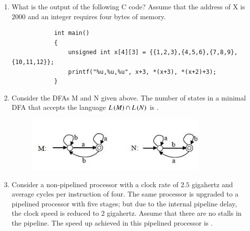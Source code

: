 \documentclass[journal,12pt,onecolumn]{IEEEtran}
\theoremstyle{remark}
\begin{document}
	
	\begin{enumerate}[resume]
		
		\item What is the output of the following C code?
		Assume that the address of X is $2000$  and an integer requires four bytes of memory.
		
		\begin{verbatim}
			int main()
			{
				unsigned int x[4][3] = {{1,2,3},{4,5,6},{7,8,9},{10,11,12}};
				printf("%u,%u,%u", x+3, *(x+3), *(x+2)+3);
			}
		\end{verbatim}
		
		\hfill{}
		
		\begin{enumerate}
		\end{enumerate}
		
		\item Consider the DFAs M and N given above. The number of states in a minimal DFA that accepts the language $L\left(M\right) \cap L\left(N\right)$ is \underline{\hspace{2cm}}.
		
		\begin{figure}[H]
			\centering
			\includegraphics[width=0.5\linewidth]{figs/screenshot002}
		\end{figure}
		
		
		\hfill{}
		
		\item Consider a non-pipelined processor with a clock rate of $2.5$ gigahertz and average cycles per instruction of four. The same processor is upgraded to a pipelined processor with five stages; but due to the internal pipeline delay, the clock speed is reduced to $2$ gigahertz. Assume that there are no stalls in the pipeline. The speed up achieved in this pipelined processor is \underline{\hspace{2cm}}.
		

\end{enumerate}
\end{document}
